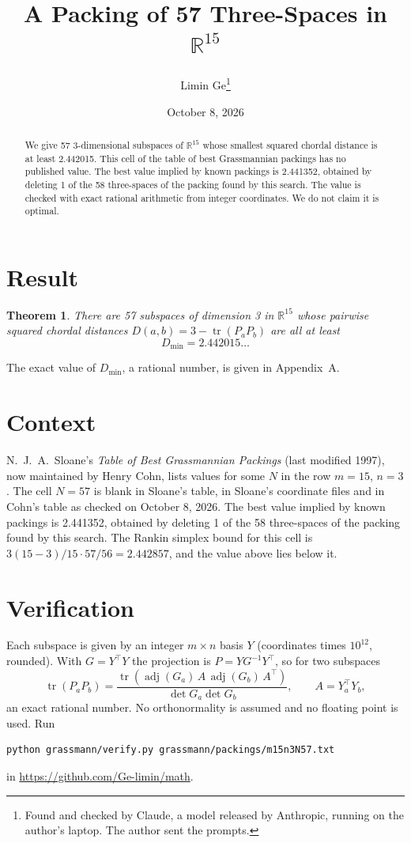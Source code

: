 \documentclass[11pt,a4paper]{article}
\title{A Packing of 57 Three-Spaces in $\mathbb{R}^{15}$}
\author{Limin Ge\thanks{Found and checked by Claude, a model released by Anthropic, running on the author's laptop. The author sent the prompts.}}
\date{October 8, 2026}
\newtheorem*{theorem}{Theorem}
\begin{document}
\maketitle
\begin{abstract}
We give 57 3-dimensional subspaces of $\mathbb{R}^{15}$ whose smallest squared chordal distance is at least 2.442015. This cell of the table of best Grassmannian packings has no published value. The best value implied by known packings is 2.441352, obtained by deleting 1 of the 58 three-spaces of the packing found by this search. The value is checked with exact rational arithmetic from integer coordinates. We do not claim it is optimal.
\end{abstract}

\section{Result}
\begin{theorem}
There are 57 subspaces of dimension 3 in $\mathbb{R}^{15}$ whose pairwise squared chordal distances $D(a,b) = 3 - \operatorname{tr}(P_aP_b)$ are all at least
\[ D_{\min} = 2.442015\ldots \]
\end{theorem}
The exact value of $D_{\min}$, a rational number, is given in Appendix~A.


\section{Context}
N.~J.~A.~Sloane's \emph{Table of Best Grassmannian Packings} (last modified 1997), now maintained by Henry Cohn, lists values for some $N$ in the row $m=15$, $n=3$. The cell $N=57$ is blank in Sloane's table, in Sloane's coordinate files and in Cohn's table as checked on October 8, 2026. The best value implied by known packings is 2.441352, obtained by deleting 1 of the 58 three-spaces of the packing found by this search. The Rankin simplex bound for this cell is $3(15-3)/15\cdot 57/56 = 2.442857$, and the value above lies below it.


\section{Verification}
Each subspace is given by an integer $m\times n$ basis $Y$ (coordinates times $10^{12}$, rounded). With $G=Y^\top Y$ the projection is $P=YG^{-1}Y^\top$, so for two subspaces
\[ \operatorname{tr}(P_aP_b)=\frac{\operatorname{tr}(\operatorname{adj}(G_a)\,A\,\operatorname{adj}(G_b)\,A^\top)}{\det G_a\det G_b},\qquad A=Y_a^\top Y_b, \]
an exact rational number. No orthonormality is assumed and no floating point is used. Run
\begin{verbatim}
python grassmann/verify.py grassmann/packings/m15n3N57.txt
\end{verbatim}
in \url{https://github.com/Ge-limin/math}.
\end{document}
